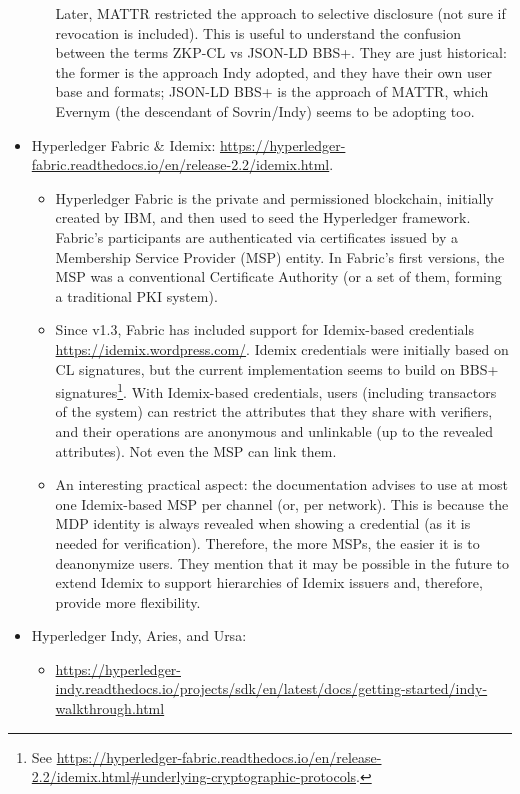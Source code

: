 \begin{itemize}
\begin{itemize}
    Later, MATTR restricted the approach to selective disclosure (not sure if
    revocation is included). This is useful to understand the confusion between
    the terms ZKP-CL vs JSON-LD BBS+. They are just historical: the former is the
    approach Indy adopted, and they have their own user base and formats;
    JSON-LD BBS+ is the approach of MATTR, which Evernym (the descendant of
    Sovrin/Indy) seems to be adopting too.
  \end{itemize}
\item Hyperledger Fabric \& Idemix: \url{https://hyperledger-fabric.readthedocs.io/en/release-2.2/idemix.html}.
  \begin{itemize}
  \item Hyperledger Fabric is the private and permissioned blockchain, initially
    created by IBM, and then used to seed the Hyperledger framework. Fabric's
    participants are authenticated via certificates issued by a Membership
    Service Provider (MSP) entity. In Fabric's first versions, the MSP was a
    conventional Certificate Authority (or a set of them, forming a traditional
    PKI system).
  \item Since v1.3, Fabric has included support for Idemix-based credentials
    \url{https://idemix.wordpress.com/}. Idemix credentials were initially based
    on CL signatures, but the current implementation seems to build on BBS+
    signatures\footnote{See \url{https://hyperledger-fabric.readthedocs.io/en/release-2.2/idemix.html\#underlying-cryptographic-protocols}.}.    
    With Idemix-based credentials, users (including transactors of the system)
    can restrict the attributes that they share with verifiers, and their
    operations are anonymous and unlinkable (up to the revealed attributes). Not
    even the MSP can link them.
  \item An interesting practical aspect: the documentation advises to use at
    most one Idemix-based MSP per channel (or, per network). This is because
    the MDP identity is always revealed when showing a credential (as it is
    needed for verification). Therefore, the more MSPs, the easier it is to
    deanonymize users. They mention that it may be possible in the future to
    extend Idemix to support hierarchies of Idemix issuers and, therefore,
    provide more flexibility.
  \end{itemize}
\item Hyperledger Indy, Aries, and Ursa:
  \begin{itemize}
  \item \url{https://hyperledger-indy.readthedocs.io/projects/sdk/en/latest/docs/getting-started/indy-walkthrough.html}

\end{itemize}
\end{itemize}
